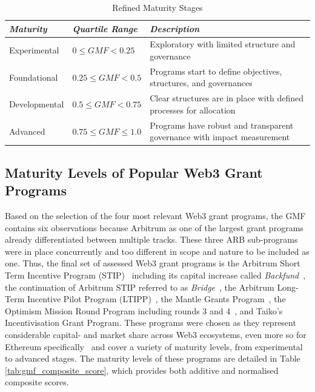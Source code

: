 \documentclass[conference]{IEEEtran}
\begin{document}
\begin{table}[htbp]
\caption{Refined Maturity Stages}
\centering
\footnotesize
\begin{tabular}{p{1.5cm}p{2.5cm}p{3.5cm}}
\hline
\textbf{\textit{Maturity}} & \textbf{\textit{Quartile Range}} & \textbf{\textit{Description}} \\
\hline
Experimental & \( 0 \leq GMF < 0.25 \) & Exploratory with limited structure and governance \\
Foundational & \( 0.25 \leq GMF < 0.5 \) & Programs start to define objectives, structures, and governances \\
Developmental & \( 0.5 \leq GMF < 0.75 \) & Clear structures are in place with defined processes for allocation \\
Advanced & \( 0.75 \leq GMF \leq 1.0 \) & Programs have robust and transparent governance with impact measurement \\
\hline
\end{tabular}
\label{tab:revised_maturity_stages}
\end{table}

\subsection{Maturity Levels of Popular Web3 Grant Programs}\label{sec_4.2}

Based on the selection of the four most relevant Web3 grant programs, the GMF contains six observations because Arbitrum as one of the largest grant programs already differentiated between multiple tracks. These three ARB sub-programs were in place concurrently and too different in scope and nature to be included as one. Thus, the final set of assessed Web3 grant programs is the Arbitrum Short Term Incentive Program (STIP)~\cite{tnorm_arbitrums_2023,arbitrum_dao_arbitrum_2023} including its capital increase called \textit{Backfund}~\cite{frisson_arbitrum_2023}, the continuation of Arbitrum STIP referred to as \textit{Bridge}~\cite{lumley_stip-bridge_2024,arbitrum_dao_double-down_2024}, the Arbitrum Long-Term Incentive Pilot Program (LTIPP)~\cite{stein_arbitrum_2024}, the Mantle Grants Program~\cite{bitdao_passed_2023}, the Optimism Mission Round Program including rounds 3 and 4~\cite{the_optimism_collective_what_2024}, and Taiko's Incentivisation Grant Program. These programs were chosen as they represent considerable capital- and market share across Web3 ecosystems, even more so for Ethereum specifically~\cite{marz_airdrops_2024} and cover a variety of maturity levels, from experimental to advanced stages. The maturity levels of these programs are detailed in Table \ref{tab:gmf_composite_score}, which provides both additive and normalised composite scores.
\end{document}
